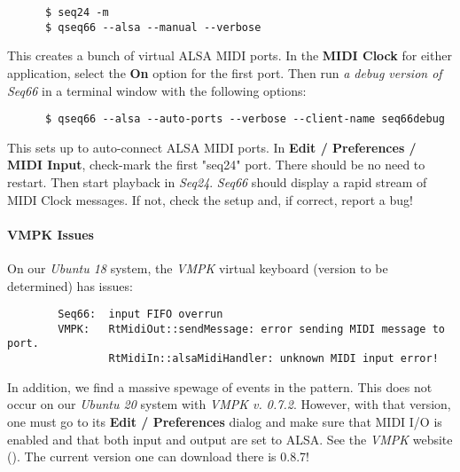    \begin{verbatim}
      $ seq24 -m
      $ qseq66 --alsa --manual --verbose
   \end{verbatim}

   This creates a bunch of virtual ALSA MIDI ports.
   In the \textbf{MIDI Clock} for either application,
   select the \textbf{On} option for the first port.
   Then run \textsl{a debug version of Seq66} in a terminal window
   with the following options:

   \begin{verbatim}
      $ qseq66 --alsa --auto-ports --verbose --client-name seq66debug
   \end{verbatim}

   This sets up to auto-connect ALSA MIDI ports.  In
   \textbf{Edit / Preferences / MIDI Input}, check-mark the first
   "seq24" port.  There should be no need to restart.
   Then start playback in \textsl{Seq24}.
   \textsl{Seq66} should display a rapid stream of MIDI Clock messages.
   If not, check the setup and, if correct, report a bug!

\paragraph{VMPK Issues}
\label{paragraph:alsa_testing_vmpk_issues}

   On our \textsl{Ubuntu 18} system, the \textsl{VMPK} virtual keyboard
   (version to be determined) has issues:

   \begin{verbatim}
        Seq66:  input FIFO overrun
        VMPK:   RtMidiOut::sendMessage: error sending MIDI message to port.
                RtMidiIn::alsaMidiHandler: unknown MIDI input error!
   \end{verbatim}

   In addition, we find a massive spewage of events in the pattern.
   This does not occur on our \textsl{Ubuntu 20} system with
   \textsl{VMPK v. 0.7.2}.
   However, with that version, one must go to its \textbf{Edit / Preferences}
   dialog and make sure that MIDI I/O is enabled and that both input
   and output are set to ALSA.
   See the \textsl{VMPK} website (\cite{vmpk}).
   The current version one can download there is 0.8.7!

